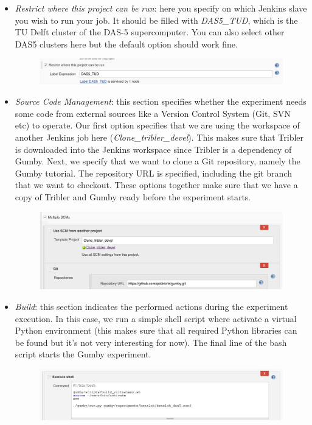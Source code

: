 \documentclass{article}
\begin{document}
\begin{itemize}
	\item \emph{Restrict where this project can be run}: here you specify on which Jenkins slave you wish to run your job. It should be filled with \emph{DAS5\_TUD}, which is the TU Delft cluster of the DAS-5 supercomputer. You can also select other DAS5 clusters here but the default option should work fine.
	\begin{figure}[h!]
		\includegraphics[width=\columnwidth]{jenkins_restrict.png}
	\end{figure}
	\item \emph{Source Code Management}: this section specifies whether the experiment needs some code from external sources like a Version Control System (Git, SVN etc) to operate. Our first option specifies that we are using the workspace of another Jenkins job here (\emph{Clone\_tribler\_devel}). This makes sure that Tribler is downloaded into the Jenkins workspace since Tribler is a dependency of Gumby. Next, we specify that we want to clone a Git repository, namely the Gumby tutorial. The repository URL is specified, including the git branch that we want to checkout. These options together make sure that we have a copy of Tribler and Gumby ready before the experiment starts.
	\begin{figure}[h!]
		\includegraphics[width=\columnwidth]{jenkins_source.png}
	\end{figure}
	\item \emph{Build}: this section indicates the performed actions during the experiment execution. In this case, we run a simple shell script where activate a virtual Python environment (this makes sure that all required Python libraries can be found but it's not very interesting for now). The final line of the bash script starts the Gumby experiment.
	\begin{figure}[h!]
		\includegraphics[width=\columnwidth]{jenkins_build.png}

\end{figure}
\end{itemize}
\end{document}
